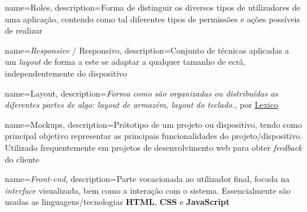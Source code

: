 











{
    name=Roles,
    description={Forma de distinguir os diversos tipos de utilizadores de uma aplicação, contendo como tal diferentes tipos de permissões e ações possíveis de realizar}
}

{
    name=\textit{Responsive} / Responsivo,
    description={Conjunto de técnicas aplicadas a um \textit{layout} de forma a este se adaptar a qualquer tamanho de ecrã, independentemente do dispositivo}
}

{
    name=Layout,
	description={\textit{Forma como são organizadas ou distribuídas as diferentes partes de algo: layout de armazém, layout do teclado.}, por \href{https://www.lexico.pt/layout/}{Lexico}}
}

{
    name=Mockups,
	description={Prótotipo de um projeto ou dispositivo, tendo como principal objetivo representar as principais funcionalidades do projeto/dispositivo. Utilizado frequentemente em projetos de desenvolvimento web para obter \textit{feedback} do cliente}
}

{
    name=\textit{Front-end},
	description={Parte vocacionada ao utilizador final, focada na \textit{interface} visualizada, bem como a interação com o sistema. Essencialmente são usadas as linguagens/tecnologias \textbf{HTML}, \textbf{CSS} e \textbf{JavaScript}}
}

